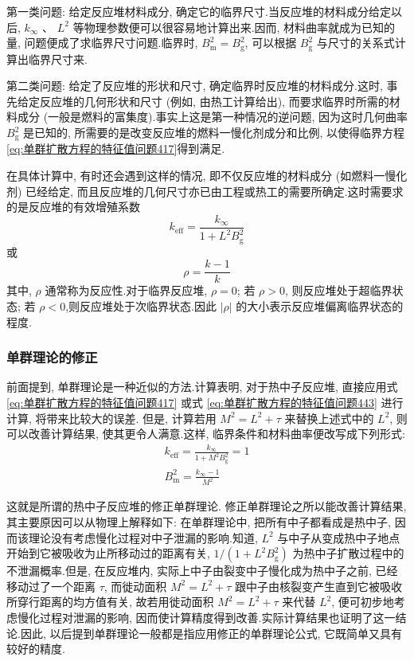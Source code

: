 \documentclass{Sichuan Normal University}
\begin{document}
第一类问题: 给定反应堆材料成分, 确定它的临界尺寸.当反应堆的材料成分给定以后, $k_{\infty}$ 、 $L^2$ 等物理参数便可以很容易地计算出来.因而, 材料曲率就成为已知的量, 问题便成了求临界尺寸问题.临界时, $B_{\mathrm{m}}^2=B_{\mathrm{g}}^2$, 可以根据 $B_{\mathrm{g}}^2$ 与尺寸的关系式计算出临界尺寸来.

第二类问题: 给定了反应堆的形状和尺寸, 确定临界时反应堆的材料成分.这时, 事先给定反应堆的几何形状和尺寸 (例如, 由热工计算给出), 而要求临界时所需的材料成分 (一般是燃料的富集度).事实上这是第一种情况的逆问题, 因为这时几何曲率 $B_{\mathrm{g}}^2$ 是已知的, 所需要的是改变反应堆的燃料一慢化剂成分和比例, 以使得临界方程 \eqref{eq:单群扩散方程的特征值问题417}得到满足.

在具体计算中, 有时还会遇到这样的情况, 即不仅反应堆的材料成分 (如燃料一慢化剂) 已经给定, 而且反应堆的几何尺寸亦已由工程或热工的需要所确定.这时需要求的是反应堆的有效增殖系数
\begin{equation}
k_{\mathrm{eff}}=\frac{k_{\infty}}{1+L^2 B_{\mathrm{g}}^2}
\end{equation}
或
\begin{equation}
\rho=\frac{k-1}{k}
\end{equation}
其中, $\rho$ 通常称为反应性.对于临界反应堆, $\rho=0$; 若 $\rho>0$, 则反应堆处于超临界状态; 若 $\rho<0$,则反应堆处于次临界状态.因此 $|\rho|$ 的大小表示反应堆偏离临界状态的程度.
\subsubsection{单群理论的修正}
前面提到, 单群理论是一种近似的方法.计算表明, 对于热中子反应堆, 直接应用式 \eqref{eq:单群扩散方程的特征值问题417} 或式 \eqref{eq:单群扩散方程的特征值问题443} 进行计算, 将带来比较大的误差.
但是, 计算若用 $M^2=L^2+\tau$ 来替换上述式中的 $L^2$, 则可以改善计算结果, 使其更令人满意.这样, 临界条件和材料曲率便改写成下列形式:
\begin{equation}
\begin{gathered}
k_{\mathrm{eff}}=\frac{k_{\infty}}{1+M^2 B_{\mathrm{g}}^2}=1 \\
B_{\mathrm{m}}^2=\frac{k_{\infty}-1}{M^2}
\end{gathered}
\end{equation}

这就是所谓的热中子反应堆的修正单群理论.
修正单群理论之所以能改善计算结果, 其主要原因可以从物理上解释如下: 在单群理论中, 把所有中子都看成是热中子, 因而该理论没有考虑慢化过程对中子泄漏的影响.知道, $L^2$ 与中子从变成热中子地点开始到它被吸收为止所移动过的距离有关, $1 /\left(1+L^2 B_{\mathrm{g}}^2\right)$ 为热中子扩散过程中的不泄漏概率.但是, 在反应堆内, 实际上中子由裂变中子慢化成为热中子之前, 已经移动过了一个距离 $\tau$, 而徙动面积 $M^2=L^2+\tau$ 跟中子由核裂变产生直到它被吸收所穿行距离的均方值有关, 故若用徙动面积 $M^2=L^2+\tau$ 来代替 $L^2$, 便可初步地考虑慢化过程对泄漏的影响, 因而使计算精度得到改善.实际计算结果也证明了这一结论.因此, 以后提到单群理论一般都是指应用修正的单群理论公式, 它既简单又具有较好的精度.
\end{document}
